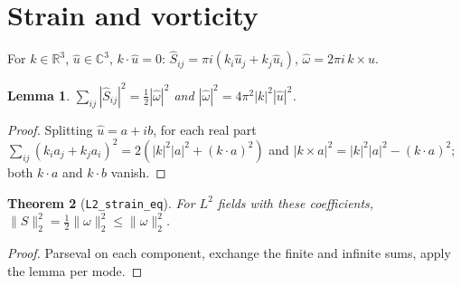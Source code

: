 \documentclass[11pt]{article}
\newtheorem{theorem}{Theorem}\newtheorem{lemma}[theorem]{Lemma}
\theoremstyle{remark}\newtheorem*{commentary}{Commentary}
\begin{document}
\section{Strain and vorticity}
For $k\in\mathbb R^3$, $\hat u\in\mathbb C^3$, $k\cdot\hat u=0$: $\hat S_{ij}=\pi i(k_i\hat u_j+k_j\hat u_i)$, $\hat\omega=2\pi i\,k\times\hat u$.
\begin{lemma} $\sum_{ij}|\hat S_{ij}|^2=\tfrac12|\hat\omega|^2$ and $|\hat\omega|^2=4\pi^2|k|^2|\hat u|^2$.\end{lemma}
\begin{proof} Splitting $\hat u=a+ib$, for each real part
$\sum_{ij}(k_ia_j+k_ja_i)^2=2(|k|^2|a|^2+(k\cdot a)^2)$ and $|k\times a|^2=|k|^2|a|^2-(k\cdot a)^2$; both
$k\cdot a$ and $k\cdot b$ vanish.\end{proof}
\begin{theorem}[\texttt{L2\_strain\_eq}] For $L^2$ fields with these coefficients, $\|S\|_2^2=\tfrac12\|\omega\|_2^2\le\|\omega\|_2^2$.\end{theorem}
\begin{proof} Parseval on each component, exchange the finite and infinite sums, apply the lemma per mode.\end{proof}
\end{document}
